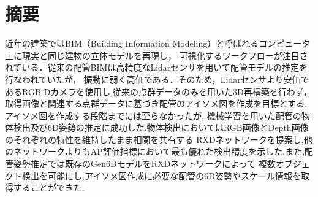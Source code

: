 \section*{%
摘要}

近年の建築ではBIM（Building Information Modeling）と呼ばれるコンピュータ上に現実と同じ建物の立体モデルを再現し，
可視化するワークフローが注目されている．従来の配管BIMは高精度なLidarセンサを用いて配管モデルの推定を行なわれていたが，
振動に弱く高価である．そのため，Lidarセンサより安価であるRGB-Dカメラを使用し,従来の点群データのみを用いた3D再構築を行わず，
取得画像と関連する点群データに基づき配管のアイソメ図を作成を目標とする.アイソメ図を作成する段階までには至らなかったが,
機械学習を用いた配管の物体検出及び6D姿勢の推定に成功した.物体検出においてはRGB画像とDepth画像のそれぞれの特性を維持したまま相関を共有する
RXDネットワークを提案し,他のネットワークよりもAP評価指標において最も優れた検出精度を示した.また,配管姿勢推定では既存のGen6DモデルをRXDネットワークによって
複数オブジェクト検出を可能にし,アイソメ図作成に必要な配管の6D姿勢やスケール情報を取得することができた.

